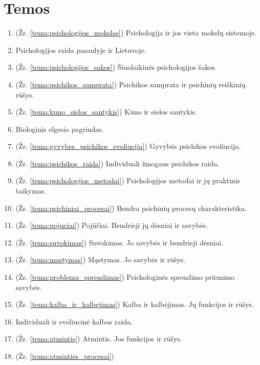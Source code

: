 \chapter{Temos}

\begin{enumerate}
  \item \label{tema_01} (Žr. \ref{tema:psichologijos_mokslas})
    Psichologija ir jos vieta mokslų sistemoje.
  \item \label{tema_02} Psichologijos raida pasaulyje ir Lietuvoje.
  \item \label{tema_03} (Žr. \ref{tema:psichologijos_sakos})
  Šiuolaikinės psichologijos šakos.
  \item \label{tema_04} (Žr. \ref{tema:psichikos_samprata})
    Psichikos samprata ir psichinių reiškinių rūšys.
  \item \label{tema_05} (Žr. \ref{tema:kuno_sielos_santykis})
  Kūno ir sielos santykis.
  \item \label{tema_06} Biologinis elgesio pagrindas.
  \item \label{tema_07} (Žr. \ref{tema:gyvybes_psichikos_evoliucija})
  Gyvybės psichikos evoliucija.
  \item \label{tema_10} (Žr. \ref{tema:psichikos_raida})
  Individuali žmogaus psichikos raida.
  \item \label{tema_11} (Žr. \ref{tema:psichologijos_metodai})
  Psichologijos metodai ir jų praktinis taikymas.
  \item \label{tema_12} (Žr. \ref{tema:psichiniai_procesai})
    Bendra psichinių procesų charakteristika.
  \item \label{tema_13} (Žr. \ref{tema:pojuciai})
    Pojūčiai. Bendrieji jų dėsniai ir savybės.
  \item \label{tema_14} (Žr. \ref{tema:suvokimas})
    Suvokimas. Jo savybės ir bendrieji dėsniai.
  \item \label{tema_15} (Žr. \ref{tema:mastymas})
    Mąstymas. Jo savybės ir rūšys.
  \item \label{tema_16} (Žr. \ref{tema:problemu_sprendimas})
    Psichologinės sprendimo priėmimo savybės.
  \item \label{tema_17} (Žr. \ref{tema:kalba_ir_kalbejimas})
  Kalba ir kalbėjimas. Jų funkcijos ir rūšys.
  \item \label{tema_20} Individuali ir evoliucinė kalbos raida.
  \item \label{tema_21} (Žr. \ref{tema:atmintis})
    Atmintis. Jos funkcijos ir rūšys.
  \item \label{tema_22} (Žr. \ref{tema:atminties_procesai})

\end{enumerate}
